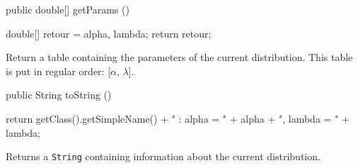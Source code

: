 \begin{tabb}
\end{tabb}
\begin{code}

   public double[] getParams ()\begin{hide} {
      double[] retour = {alpha, lambda};
      return retour;
   }\end{hide}
\end{code}
\begin{tabb}
   Return a table containing the parameters of the current distribution.
   This table is put in regular order: [$\alpha$, $\lambda$].
\end{tabb}
\begin{hide}\begin{code}

   public String toString ()\begin{hide} {
      return getClass().getSimpleName() + " : alpha = " + alpha + ", lambda = " + lambda;
   }\end{hide}
\end{code}
\begin{tabb}
   Returns a \texttt{String} containing information about the current distribution.
\end{tabb}\end{hide}
\begin{code}\begin{hide}
}\end{hide}
\end{code}
